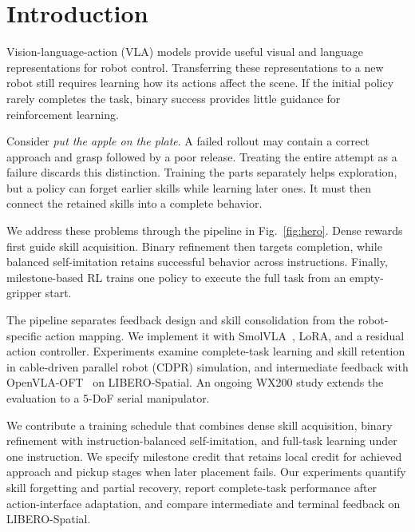 \section{Introduction}\label{sec:introduction}
Vision-language-action (VLA) models provide useful visual and language representations for robot control. Transferring these representations to a new robot still requires learning how its actions affect the scene. If the initial policy rarely completes the task, binary success provides little guidance for reinforcement learning.

Consider \emph{put the apple on the plate}. A failed rollout may contain a correct approach and grasp followed by a poor release. Treating the entire attempt as a failure discards this distinction. Training the parts separately helps exploration, but a policy can forget earlier skills while learning later ones. It must then connect the retained skills into a complete behavior.

We address these problems through the pipeline in Fig.~\ref{fig:hero}. Dense rewards first guide skill acquisition. Binary refinement then targets completion, while balanced self-imitation retains successful behavior across instructions. Finally, milestone-based RL trains one policy to execute the full task from an empty-gripper start.

The pipeline separates feedback design and skill consolidation from the robot-specific action mapping. We implement it with SmolVLA~\cite{smolvla}, LoRA, and a residual action controller. Experiments examine complete-task learning and skill retention in cable-driven parallel robot (CDPR) simulation, and intermediate feedback with OpenVLA-OFT~\cite{openvlaoft} on LIBERO-Spatial. An ongoing WX200 study extends the evaluation to a 5-DoF serial manipulator.

We contribute a training schedule that combines dense skill acquisition, binary refinement with instruction-balanced self-imitation, and full-task learning under one instruction. We specify milestone credit that retains local credit for achieved approach and pickup stages when later placement fails. Our experiments quantify skill forgetting and partial recovery, report complete-task performance after action-interface adaptation, and compare intermediate and terminal feedback on LIBERO-Spatial.
